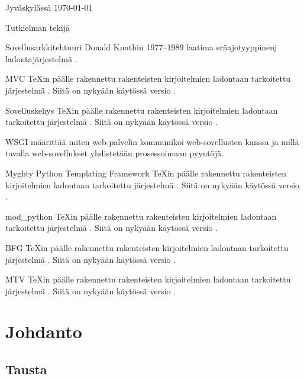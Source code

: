 \documentclass[utf8]{gradu3}
\begin{document}
Jyväskylässä \today

\bigskip

Tutkielman tekijä


\begin{thetermlist}
\item[Sovellusarkkitehtuuri] Donald Knuthin 1977--1989 laatima eräajotyyppinenj
  ladontajärjestelmä \parencite[ks.][]{knuth86:_texbook}. 
\item[MVC] \TeX in \parencite[ks.][]{knuth86:_texbook} päälle
  rakennettu rakenteisten kirjoitelmien ladontaan tarkoitettu
  järjestelmä \parencite[ks.][]{lamport94:_latex}.  Siitä on nykyään
  käytössä versio \LaTeXe.
\item[Sovelluskehys] \TeX in \parencite[ks.][]{knuth86:_texbook} päälle
  rakennettu rakenteisten kirjoitelmien ladontaan tarkoitettu
  järjestelmä \parencite[ks.][]{lamport94:_latex}.  Siitä on nykyään
  käytössä versio \LaTeXe.
\item[WSGI] määrittää miten web-palvelin kommunikoi web-sovellusten kanssa ja millä tavalla web-sovellukset
yhdistetään prosessoimaan pyyntöjä.
\item[Myghty Python Templating Framework] \TeX in \parencite[ks.][]{knuth86:_texbook} päälle
  rakennettu rakenteisten kirjoitelmien ladontaan tarkoitettu
  järjestelmä \parencite[ks.][]{lamport94:_latex}.  Siitä on nykyään
  käytössä versio \LaTeXe.
\item[mod\_python] \TeX in \parencite[ks.][]{knuth86:_texbook} päälle
  rakennettu rakenteisten kirjoitelmien ladontaan tarkoitettu
  järjestelmä \parencite[ks.][]{lamport94:_latex}.  Siitä on nykyään
  käytössä versio \LaTeXe.
\item[BFG] \TeX in \parencite[ks.][]{knuth86:_texbook} päälle
  rakennettu rakenteisten kirjoitelmien ladontaan tarkoitettu
  järjestelmä \parencite[ks.][]{lamport94:_latex}.  Siitä on nykyään
  käytössä versio \LaTeXe.
\item[MTV] \TeX in \parencite[ks.][]{knuth86:_texbook} päälle
  rakennettu rakenteisten kirjoitelmien ladontaan tarkoitettu
  järjestelmä \parencite[ks.][]{lamport94:_latex}.  Siitä on nykyään
  käytössä versio \LaTeXe.
\end{thetermlist}

\chapter{Johdanto}

\section{Tausta}
\end{document}
